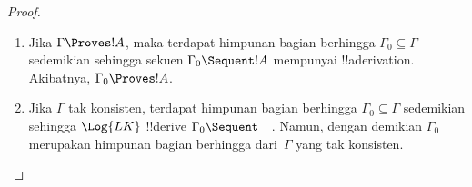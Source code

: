 \documentclass[../../../include/open-logic-section]{subfiles}
\begin{document}
\begin{proof}
  \begin{enumerate}
    \item Jika $\Gamma \Proves !A$, maka terdapat himpunan bagian berhingga
      $\Gamma_0 \subseteq \Gamma$ sedemikian sehingga sekuen
      $\Gamma_0 \Sequent !A$ mempunyai !!a{derivation}. Akibatnya,
      $\Gamma_0 \Proves !A$.
    \item Jika $\Gamma$ tak konsisten, terdapat himpunan bagian berhingga
      $\Gamma_0 \subseteq \Gamma$ sedemikian sehingga $\Log{LK}$
      !!{derive} $\Gamma_0 \Sequent \quad$. Namun, dengan demikian
      $\Gamma_0$ merupakan himpunan bagian berhingga dari~$\Gamma$ yang tak
      konsisten.
  \end{enumerate}
\end{proof}
\end{document}
